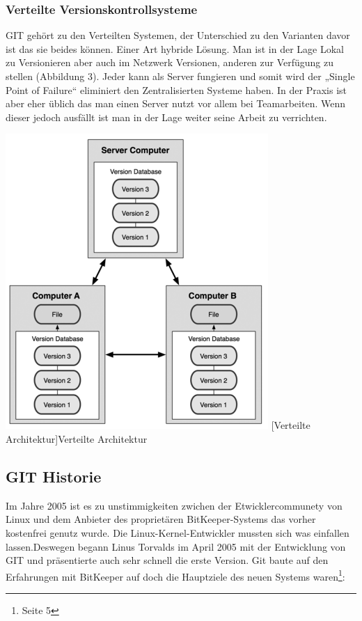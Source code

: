 \documentclass[12pt,a4paper,bibliography=totocnumbered,listof=totocnumbered]{scrartcl}
\begin{document}
\subsubsection{Verteilte Versionskontrollsysteme}
GIT gehört zu den Verteilten Systemen, der Unterschied zu den Varianten davor ist das sie beides können. 
Einer Art hybride Lösung. Man ist in der Lage Lokal zu Versionieren aber auch im Netzwerk Versionen, anderen zur Verfügung zu stellen (Abbildung 3). Jeder kann als Server fungieren und somit  wird der „Single Point of Failure“ eliminiert den Zentralisierten Systeme haben. In der Praxis ist aber eher üblich das man einen Server nutzt vor allem bei Teamarbeiten. Wenn dieser jedoch ausfällt ist man in der Lage weiter seine Arbeit zu verrichten.
\newline
\vspace{3pt}
\begin{minipage}{\linewidth}
	\centering
	\includegraphics[width=0.3\linewidth]{Bilder/git.png}
	[Verteilte Architektur]{Verteilte Architektur\footnotemark }
	\label{fig:osgi}
\end{minipage}
   


\subsection{GIT Historie }
Im Jahre 2005 ist es zu unstimmigkeiten zwichen der Etwicklercommunety von Linux und dem Anbieter des proprietären BitKeeper-Systems das vorher kostenfrei genutz wurde. Die Linux-Kernel-Entwickler mussten sich was einfallen lassen.Deswegen begann  Linus Torvalds im April 2005 mit der Entwicklung von GIT und präsentierte auch sehr schnell die erste Version. Git baute auf den Erfahrungen mit BitKeeper auf doch die Hauptziele des neuen Systems waren\footnote{\cite{chacon2009pro} Seite 5}:
\end{document}
